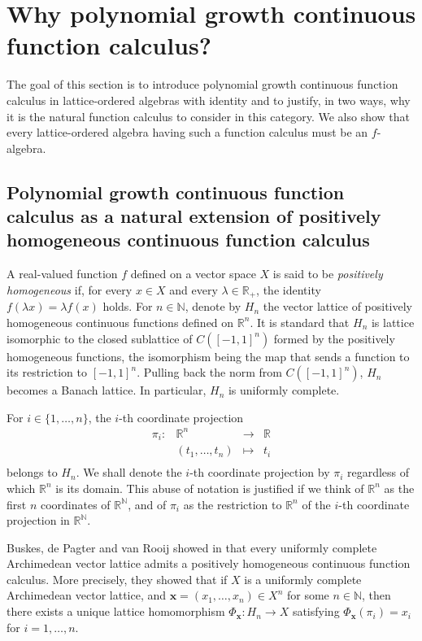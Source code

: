 \documentclass{amsart}
\theoremstyle{plain}
\theoremstyle{definition}
\theoremstyle{remark}
\newcommand\N{\ensuremath{\mathbb{N}}}
\newcommand\R{\ensuremath{\mathbb{R}}}
\newcommand{\falg}{$f\!$-algebra}
\newcommand{\Phx}{\Phi_{\bm x}}
\begin{document}
\section{Why polynomial growth continuous function
calculus?}\label{sec:why}

The goal of this section is to introduce polynomial growth continuous
function calculus in lattice-ordered algebras with identity and to
justify, in two ways, why it is the natural function calculus to
consider in this category. We also show that every lattice-ordered
algebra having such a function calculus must be an \falg.

\subsection{Polynomial growth continuous function calculus as a
natural extension of positively homogeneous continuous function
calculus}

A real-valued function $f$ defined on a vector space $X$ is said to be
\emph{positively homogeneous} if, for every $x \in X$ and every $\lambda \in
\R_+$, the identity $f(\lambda x)=\lambda f(x)$ holds. For $n \in \N$, denote by $H_n$ the
vector lattice of positively homogeneous continuous functions defined
on $\R^{n}$. It is standard that $H_n$ is lattice isomorphic to the closed
sublattice of $C([-1,1]^{n})$ formed by the positively homogeneous
functions, the isomorphism being the map that sends a function to its
restriction to $[-1,1]^{n}$. Pulling back the norm from
$C([-1,1]^{n})$, $H_n$ becomes a Banach lattice. In particular, $H_n$ is uniformly complete.

For $i \in \{1,\ldots ,n\}$, the $i$-th coordinate projection
\[
\begin{array}{cccc}
\pi _i\colon& \R^{n} & \longrightarrow & \R \\
        & (t_1,\ldots ,t_n) & \longmapsto & t_i \\
\end{array}
\]
belongs to $H_n$. We shall denote the $i$-th coordinate
projection by $\pi _i$ regardless of which $\R^{n}$ is its domain. This
abuse of notation is justified if we think of $\R^{n}$ as the first
$n$ coordinates of $\R^{\N}$, and of $\pi _i$ as the restriction to
$\R^{n}$ of the $i$-th coordinate projection in $\R^{\N}$.

Buskes, de Pagter and van Rooij showed in \cite[Theorem 3.7
]{buskes_depagter_vanrooij1991} that every uniformly complete
Archimedean vector lattice admits a positively homogeneous continuous
function calculus. More precisely, they showed that if $X$ is a
uniformly complete Archimedean vector lattice, and $\bm
x=(x_1,\ldots ,x_n)\in X^{n}$ for some $n \in \N$, then there exists a unique lattice
homomorphism $\Phx\colon H_n\to X$ satisfying $\Phx(\pi _i)=x_i$ for
$i=1,\ldots ,n$.
\end{document}
